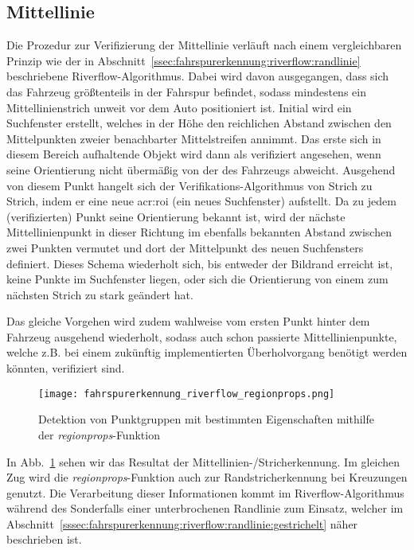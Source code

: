 \subsection{Mittellinie \dcfirstauthorshort}
\label{ssec:fahrspurerkennung_punkt:verifikation:mittellinie}
Die Prozedur zur Verifizierung der Mittellinie verläuft nach einem vergleichbaren Prinzip wie der in Abschnitt~\ref{ssec:fahrspurerkennung:riverflow:randlinie} beschriebene Riverflow-Algorithmus. Dabei wird davon ausgegangen, dass sich das Fahrzeug größtenteils in der Fahrspur befindet, sodass mindestens ein Mittellinienstrich unweit vor dem Auto positioniert ist. Initial wird ein Suchfenster erstellt, welches in der Höhe den reichlichen Abstand zwischen den Mittelpunkten zweier benachbarter Mittelstreifen annimmt. Das erste sich in diesem Bereich aufhaltende Objekt wird dann als verifiziert angesehen, wenn seine Orientierung nicht übermäßig von der des Fahrzeugs abweicht. Ausgehend von diesem Punkt \glqq hangelt\grqq{} sich der Verifikations-Algorithmus von Strich zu Strich, indem er eine neue \gls{acr:roi} (ein neues Suchfenster) aufstellt. Da zu jedem (verifizierten) Punkt seine Orientierung bekannt ist, wird der nächste Mittellinienpunkt in dieser Richtung im ebenfalls bekannten Abstand zwischen zwei Punkten vermutet und dort der Mittelpunkt des neuen Suchfensters definiert. Dieses Schema wiederholt sich, bis entweder der Bildrand erreicht ist, keine Punkte im Suchfenster liegen, oder sich die Orientierung von einem zum nächsten Strich zu stark geändert hat.

Das gleiche Vorgehen wird zudem wahlweise vom ersten Punkt hinter dem Fahrzeug ausgehend wiederholt, sodass auch schon passierte Mittellinienpunkte, welche z.B. bei einem zukünftig implementierten Überholvorgang benötigt werden könnten, verifiziert sind.

\begin{figure}[htbp]
	\centering
	\texttt{[image: fahrspurerkennung\_riverflow\_regionprops.png]}
	\caption{Detektion von Punktgruppen mit bestimmten Eigenschaften mithilfe der \emph{regionprops}-Funktion}
	\label{fig:riverflow:mittellinie:regionprops}
\end{figure}

In Abb.~\ref{fig:riverflow:mittellinie:regionprops} sehen wir das Resultat der Mittellinien-/Stricherkennung. Im gleichen Zug wird die \emph{regionprops}-Funktion auch zur Randstricherkennung bei Kreuzungen genutzt. Die Verarbeitung dieser Informationen kommt im Riverflow-Algorithmus während des Sonderfalls einer unterbrochenen Randlinie zum Einsatz, welcher im Abschnitt~\ref{sssec:fahrspurerkennung:riverflow:randlinie:gestrichelt} näher beschrieben ist.